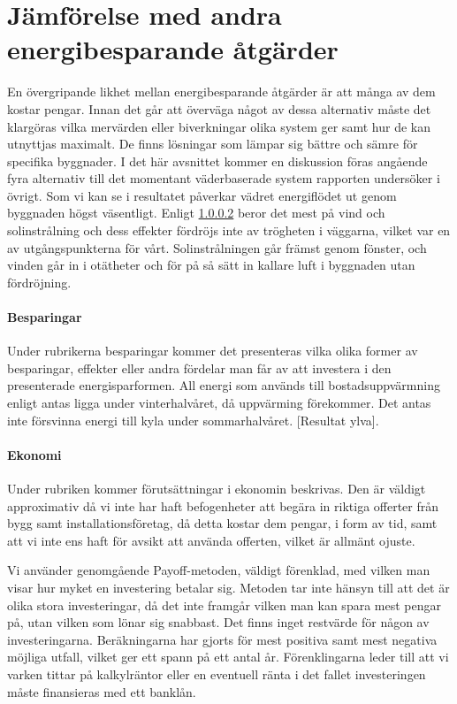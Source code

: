 \section{Jämförelse med andra energibesparande åtgärder}

En övergripande likhet mellan energibesparande åtgärder är att många av dem kostar pengar. Innan det går att överväga något av dessa alternativ måste det klargöras vilka mervärden eller biverkningar olika system ger samt hur de kan utnyttjas maximalt. De finns lösningar som lämpar sig bättre och sämre för specifika byggnader. I det här avsnittet kommer en diskussion föras angående fyra alternativ till det momentant väderbaserade system rapporten undersöker i övrigt.
Som vi kan se i resultatet påverkar vädret energiflödet ut genom byggnaden högst väsentligt. Enligt \ref{} beror det mest på vind och solinstrålning och dess effekter fördröjs inte av trögheten i väggarna, vilket var en av utgångspunkterna för vårt. Solinstrålningen går främst genom fönster, och vinden går in i otätheter och för på så sätt in kallare luft i byggnaden utan fördröjning.

\paragraph{Besparingar}
Under rubrikerna besparingar kommer det presenteras vilka olika former av besparingar, effekter eller andra fördelar man får av att investera i den presenterade energisparformen. All energi som används till bostadsuppvärmning enligt \cite{energideklaration} antas ligga under vinterhalvåret, då uppvärming förekommer. Det antas inte försvinna energi till kyla under sommarhalvåret.  [Resultat ylva].

\paragraph{Ekonomi}
Under rubriken kommer förutsättningar i ekonomin beskrivas. Den är väldigt approximativ då vi inte har haft befogenheter att begära in riktiga offerter från bygg samt installationsföretag, då detta kostar dem pengar, i form av tid, samt att vi inte ens haft för avsikt att använda offerten, vilket är allmänt ojuste.

Vi använder genomgående Payoff-metoden, väldigt förenklad, med vilken man visar hur myket en investering betalar sig. Metoden tar inte hänsyn till att det är olika stora investeringar, då det inte framgår vilken man kan spara mest pengar på, utan vilken som lönar sig snabbast. Det finns inget restvärde för någon av investeringarna. Beräkningarna har gjorts för mest positiva samt mest negativa möjliga utfall, vilket ger ett spann på ett antal år. Förenklingarna leder till att vi varken tittar på kalkylräntor eller en eventuell ränta i det fallet investeringen måste finansieras med ett banklån.

